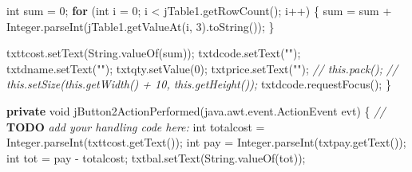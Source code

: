 \documentclass[
  10pt,
]{article}
\newenvironment{Shaded}{}{}
\newcommand{\AlertTok}[1]{\textcolor[rgb]{1.00,0.00,0.00}{\textbf{#1}}}
\newcommand{\BuiltInTok}[1]{\textcolor[rgb]{0.00,0.50,0.00}{#1}}
\newcommand{\CommentTok}[1]{\textcolor[rgb]{0.38,0.63,0.69}{\textit{#1}}}
\newcommand{\ControlFlowTok}[1]{\textcolor[rgb]{0.00,0.44,0.13}{\textbf{#1}}}
\newcommand{\DataTypeTok}[1]{\textcolor[rgb]{0.56,0.13,0.00}{#1}}
\newcommand{\DecValTok}[1]{\textcolor[rgb]{0.25,0.63,0.44}{#1}}
\newcommand{\FunctionTok}[1]{\textcolor[rgb]{0.02,0.16,0.49}{#1}}
\newcommand{\KeywordTok}[1]{\textcolor[rgb]{0.00,0.44,0.13}{\textbf{#1}}}
\newcommand{\NormalTok}[1]{#1}
\newcommand{\OperatorTok}[1]{\textcolor[rgb]{0.40,0.40,0.40}{#1}}
\newcommand{\StringTok}[1]{\textcolor[rgb]{0.25,0.44,0.63}{#1}}
\begin{document}
\begin{Shaded}
\begin{Highlighting}[numbers=left,,]
        \DataTypeTok{int}\NormalTok{ sum }\OperatorTok{=} \DecValTok{0}\OperatorTok{;}
        \ControlFlowTok{for} \OperatorTok{(}\DataTypeTok{int}\NormalTok{ i }\OperatorTok{=} \DecValTok{0}\OperatorTok{;}\NormalTok{ i }\OperatorTok{\textless{}}\NormalTok{ jTable1}\OperatorTok{.}\FunctionTok{getRowCount}\OperatorTok{();}\NormalTok{ i}\OperatorTok{++)} \OperatorTok{\{}
\NormalTok{            sum }\OperatorTok{=}\NormalTok{ sum }\OperatorTok{+} \BuiltInTok{Integer}\OperatorTok{.}\FunctionTok{parseInt}\OperatorTok{(}\NormalTok{jTable1}\OperatorTok{.}\FunctionTok{getValueAt}\OperatorTok{(}\NormalTok{i}\OperatorTok{,} \DecValTok{3}\OperatorTok{).}\FunctionTok{toString}\OperatorTok{());}
        \OperatorTok{\}}

\NormalTok{        txttcost}\OperatorTok{.}\FunctionTok{setText}\OperatorTok{(}\BuiltInTok{String}\OperatorTok{.}\FunctionTok{valueOf}\OperatorTok{(}\NormalTok{sum}\OperatorTok{));}
\NormalTok{        txtdcode}\OperatorTok{.}\FunctionTok{setText}\OperatorTok{(}\StringTok{""}\OperatorTok{);}
\NormalTok{        txtdname}\OperatorTok{.}\FunctionTok{setText}\OperatorTok{(}\StringTok{""}\OperatorTok{);}
\NormalTok{        txtqty}\OperatorTok{.}\FunctionTok{setValue}\OperatorTok{(}\DecValTok{0}\OperatorTok{);}
\NormalTok{        txtprice}\OperatorTok{.}\FunctionTok{setText}\OperatorTok{(}\StringTok{""}\OperatorTok{);}
        \CommentTok{// this.pack();}
        \CommentTok{// this.setSize(this.getWidth() + 10, this.getHeight());}
\NormalTok{        txtdcode}\OperatorTok{.}\FunctionTok{requestFocus}\OperatorTok{();}
    \OperatorTok{\}}                                        

    \KeywordTok{private} \DataTypeTok{void} \FunctionTok{jButton2ActionPerformed}\OperatorTok{(}\NormalTok{java}\OperatorTok{.}\FunctionTok{awt}\OperatorTok{.}\FunctionTok{event}\OperatorTok{.}\FunctionTok{ActionEvent}\NormalTok{ evt}\OperatorTok{)} \OperatorTok{\{}                                         
        \CommentTok{// }\AlertTok{TODO}\CommentTok{ add your handling code here:}
        \DataTypeTok{int}\NormalTok{ totalcost }\OperatorTok{=} \BuiltInTok{Integer}\OperatorTok{.}\FunctionTok{parseInt}\OperatorTok{(}\NormalTok{txttcost}\OperatorTok{.}\FunctionTok{getText}\OperatorTok{());}
        \DataTypeTok{int}\NormalTok{ pay }\OperatorTok{=} \BuiltInTok{Integer}\OperatorTok{.}\FunctionTok{parseInt}\OperatorTok{(}\NormalTok{txtpay}\OperatorTok{.}\FunctionTok{getText}\OperatorTok{());}
        \DataTypeTok{int}\NormalTok{ tot }\OperatorTok{=}\NormalTok{ pay }\OperatorTok{{-}}\NormalTok{ totalcost}\OperatorTok{;}
\NormalTok{        txtbal}\OperatorTok{.}\FunctionTok{setText}\OperatorTok{(}\BuiltInTok{String}\OperatorTok{.}\FunctionTok{valueOf}\OperatorTok{(}\NormalTok{tot}\OperatorTok{));}


\end{Highlighting}
\end{Shaded}
\end{document}
